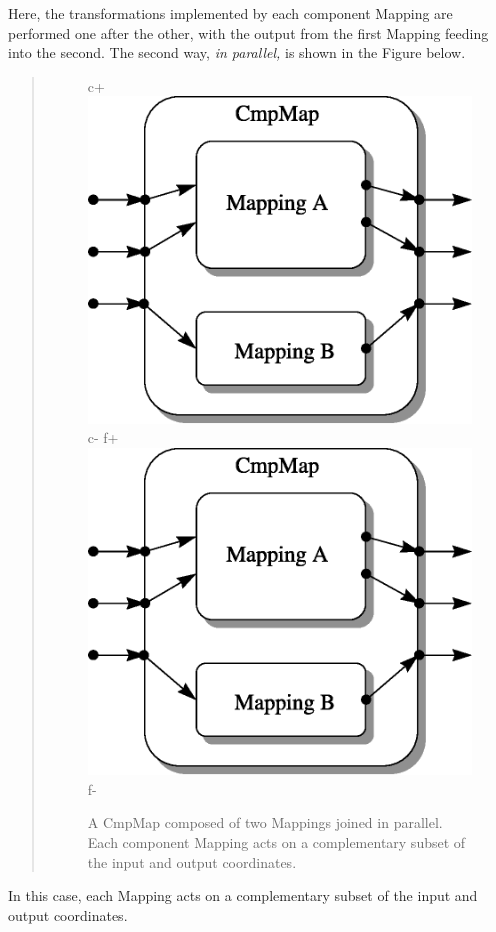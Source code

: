 \documentclass[twoside,11pt]{article}
\begin{document}
\begin{htmlonly}
   Here, the transformations implemented by each component Mapping are
   performed one after the other, with the output from the first Mapping
   feeding into the second.  The second way, {\em{in parallel,}} is shown in
   the Figure below.
   \begin{quote}
   \begin{figure}
   \label{fig:parallelcmpmap}
c+
   \includegraphics[scale=1.0]{sun211_figures/parallel.eps}
c-
f+
   \includegraphics[scale=1.0]{sun210_figures/parallel.eps}
f-
   \caption{A CmpMap composed of two Mappings joined in parallel. Each
   component Mapping acts on a complementary subset of the input and
   output coordinates.}
   \end{figure}
   \end{quote}
\end{htmlonly}
In this case, each Mapping acts on a complementary subset of the
input and output coordinates.
\end{document}
